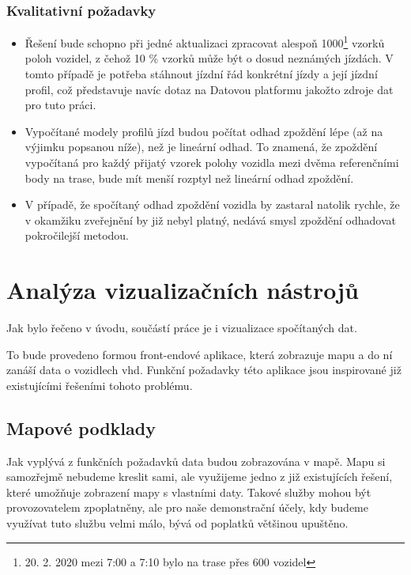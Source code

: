\subsubsection{Kvalitativní požadavky} \label{subsubsection:kvalitativni_pozadavky}


\begin{itemize}


\item
Řešení bude schopno při jedné aktualizaci zpracovat alespoň 1000\footnote{20. 2. 2020 mezi 7:00 a 7:10 bylo na trase přes 600 vozidel} vzorků poloh vozidel, z čehož 10 \% vzorků může být o dosud neznámých jízdách. V tomto případě je potřeba stáhnout jízdní řád konkrétní jízdy a její jízdní profil, což představuje navíc dotaz na Datovou platformu jakožto zdroje dat pro tuto práci.


\item
Vypočítané modely profilů jízd budou počítat odhad zpoždění lépe (až na výjimku popsanou níže), než je lineární odhad. To znamená, že zpoždění vypočítaná pro každý přijatý vzorek polohy vozidla mezi dvěma referenčními body na trase, bude mít menší rozptyl než lineární odhad zpoždění.


\item
V případě, že spočítaný odhad zpoždění vozidla by zastaral natolik rychle, že v okamžiku zveřejnění by již nebyl platný, nedává smysl zpoždění odhadovat pokročilejší metodou.


\end{itemize}

\section{Analýza vizualizačních nástrojů}

Jak bylo řečeno v úvodu, součástí práce je i vizualizace spočítaných dat.

\bigbreak

To bude provedeno formou front-endové aplikace, která zobrazuje mapu a do ní zanáší data o vozidlech \gls{vhd}. Funkční požadavky této aplikace jsou inspirované již existujícími řešeními tohoto problému.

\subsection{Mapové podklady}

Jak vyplývá z funkčních požadavků data budou zobrazována v mapě. Mapu si samozřejmě nebudeme kreslit sami, ale využijeme jedno z již existujících řešení, které umožňuje zobrazení mapy s vlastními daty. Takové služby mohou být provozovatelem zpoplatněny, ale pro naše demonstrační účely, kdy budeme využívat tuto službu velmi málo, bývá od poplatků většinou upuštěno.

